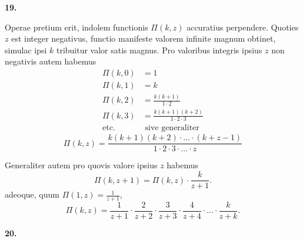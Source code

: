 \documentclass[12pt,a4paper]{article}
\newcommand{\art}[1]{\par\medskip\noindent\textbf{#1.}\par\nopagebreak\smallskip}
\begin{document}
\art{19}

Operae pretium erit, indolem functionis $\Pi(k,z)$ accuratius perpendere. Quoties $z$ est integer negativus, functio manifeste valorem infinite magnum obtinet, simulac ipsi $k$ tribuitur valor satis magnus. Pro valoribus integris ipsius $z$ non negativis autem habemus
\begin{align*}
\Pi(k,0) &= 1\\
\Pi(k,1) &= k\\
\Pi(k,2) &= \frac{k(k+1)}{1\cdot2}\\
\Pi(k,3) &= \frac{k(k+1)(k+2)}{1\cdot2\cdot3}\\
\text{etc. } &\text{ sive generaliter}
\end{align*}
\begin{equation}
\Pi(k,z) = \frac{k(k+1)(k+2)\cdot\ldots\cdot(k+z-1)}{1\cdot2\cdot3\cdot\ldots\cdot z}\tag{[40]}
\end{equation}

Generaliter autem pro quovis valore ipsius $z$ habemus
\begin{equation}
\Pi(k,z+1) = \Pi(k,z)\cdot\frac{k}{z+1}.\tag{[41]}
\end{equation}
adeoque, quum $\Pi(1,z)=\frac{1}{z+1}$,
\begin{equation}
\Pi(k,z) = \frac{1}{z+1}\cdot\frac{2}{z+2}\cdot\frac{3}{z+3}\cdot\frac{4}{z+4}\cdot\ldots\cdot\frac{k}{z+k}.\tag{[42]}
\end{equation}

\art{20}
\end{document}
